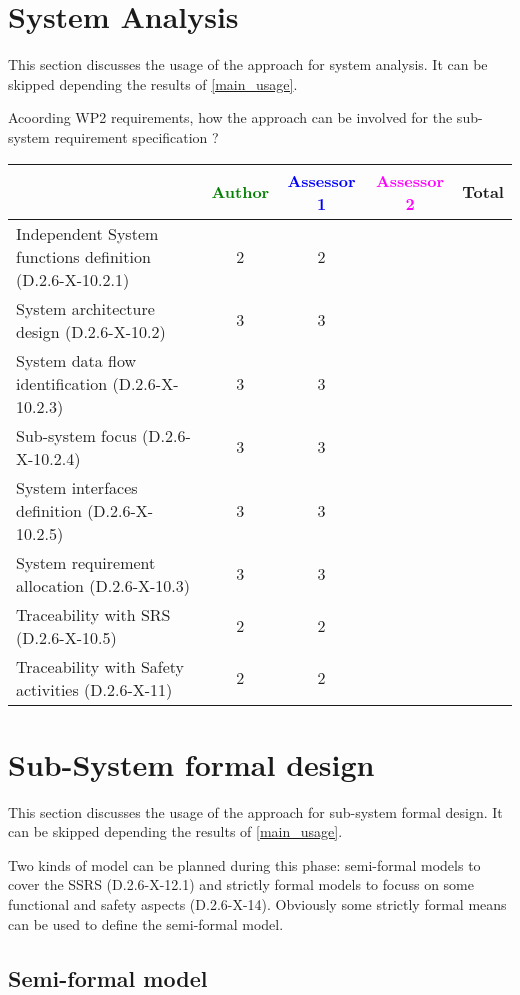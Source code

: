 \section{System Analysis}
This section discusses the usage of the approach for system analysis.
It can be skipped depending the results of \ref{main_usage}.

Acoording WP2 requirements, how the approach can be involved for the sub-system requirement specification ?

\begin{tabular}{|l | c | c | c | c|}
\hline
& \textcolor{green}{Author} & \textcolor{blue}{Assessor 1} & \textcolor{magenta}{Assessor 2} & Total \\
\hline
Independent System functions definition (D.2.6-X-10.2.1)  &2 &2 & &  \\
\hline 
System architecture design (D.2.6-X-10.2) &3 &3 & &  \\
\hline
System data flow identification (D.2.6-X-10.2.3)  &3 &3 & &  \\
\hline
Sub-system focus (D.2.6-X-10.2.4)  &3 &3 & &  \\
\hline
System interfaces definition (D.2.6-X-10.2.5)  &3 &3 & &  \\
\hline
System requirement allocation (D.2.6-X-10.3)  &3 &3 & &  \\
\hline
Traceability with SRS (D.2.6-X-10.5)  &2 &2 & &  \\
\hline
Traceability with Safety activities (D.2.6-X-11)  &2 &2 & &  \\
\hline
\end{tabular}



\section{Sub-System formal design}
This section discusses the usage of the approach for sub-system formal design.
It can be skipped depending the results of \ref{main_usage}.

Two kinds of model can be planned during this phase: semi-formal models to  cover the SSRS (D.2.6-X-12.1) and strictly formal  models to  focuss on some functional and safety aspects (D.2.6-X-14).  Obviously some strictly  formal means can be used to define the semi-formal  model.

\subsection{Semi-formal model}

